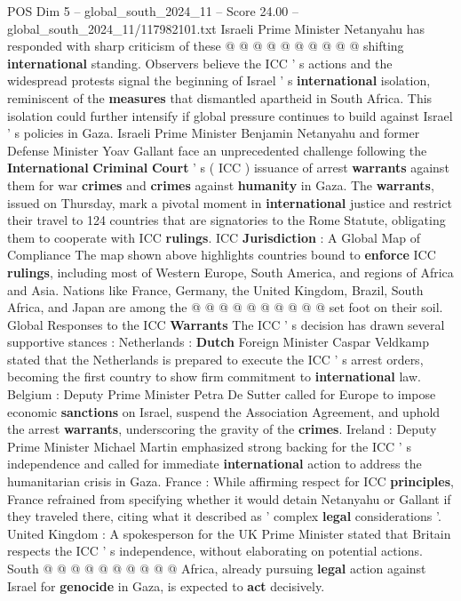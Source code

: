 \begin{textsample}{POS Dim 5 – global\_south\_2024\_11 – Score 24.00 – global\_south\_2024\_11/117982101.txt}
Israeli Prime Minister Netanyahu has responded with sharp criticism of these @ @ @ @ @ @ @ @ @ @ shifting \textbf{international} standing.
Observers believe the ICC ' s actions and the widespread protests signal the beginning of Israel ' s \textbf{international} isolation, reminiscent of the \textbf{measures} that dismantled apartheid in South Africa.
This isolation could further intensify if global pressure continues to build against Israel ' s policies in Gaza.
Israeli Prime Minister Benjamin Netanyahu and former Defense Minister Yoav Gallant face an unprecedented challenge following the \textbf{International} \textbf{Criminal} \textbf{Court} ' s ( ICC ) issuance of arrest \textbf{warrants} against them for war \textbf{crimes} and \textbf{crimes} against \textbf{humanity} in Gaza.
The \textbf{warrants}, issued on Thursday, mark a pivotal moment in \textbf{international} justice and restrict their travel to 124 countries that are signatories to the Rome Statute, obligating them to cooperate with ICC \textbf{rulings}.
ICC \textbf{Jurisdiction} : A Global Map of Compliance The map shown above highlights countries bound to \textbf{enforce} ICC \textbf{rulings}, including most of Western Europe, South America, and regions of Africa and Asia.
Nations like France, Germany, the United Kingdom, Brazil, South Africa, and Japan are among the @ @ @ @ @ @ @ @ @ @ set foot on their soil.
Global Responses to the ICC \textbf{Warrants} The ICC ' s decision has drawn several supportive stances : Netherlands : \textbf{Dutch} Foreign Minister Caspar Veldkamp stated that the Netherlands is prepared to execute the ICC ' s arrest orders, becoming the first country to show firm commitment to \textbf{international} law.
Belgium : Deputy Prime Minister Petra De Sutter called for Europe to impose economic \textbf{sanctions} on Israel, suspend the Association Agreement, and uphold the arrest \textbf{warrants}, underscoring the gravity of the \textbf{crimes}.
Ireland : Deputy Prime Minister Michael Martin emphasized strong backing for the ICC ' s independence and called for immediate \textbf{international} action to address the humanitarian crisis in Gaza.
France : While affirming respect for ICC \textbf{principles}, France refrained from specifying whether it would detain Netanyahu or Gallant if they traveled there, citing what it described as ' complex \textbf{legal} considerations '.
United Kingdom : A spokesperson for the UK Prime Minister stated that Britain respects the ICC ' s independence, without elaborating on potential actions.
South @ @ @ @ @ @ @ @ @ @ Africa, already pursuing \textbf{legal} action against Israel for \textbf{genocide} in Gaza, is expected to \textbf{act} decisively.

\end{textsample}
